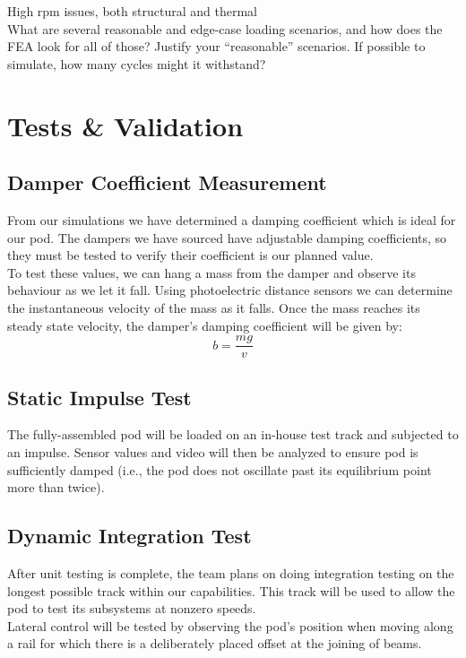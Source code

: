 \documentclass[main.tex]{subfiles}
\begin{document}
    High rpm issues, both structural and thermal\\
    What are several reasonable and edge-case loading scenarios, and how does the FEA look for all of those? Justify your “reasonable” scenarios. If possible to simulate, how many cycles might it withstand?

    \section{Tests \& Validation }
    \subsection{Damper Coefficient Measurement}
    From our simulations we have determined a damping coefficient which is ideal for our pod. The dampers we have sourced have adjustable damping coefficients, so they must be tested to verify their coefficient is our planned value.\\
    To test these values, we can hang a mass from the damper and observe its behaviour as we let it fall. Using photoelectric distance sensors we can determine the instantaneous velocity of the mass as it falls. Once the mass reaches its steady state velocity, the damper's damping coefficient will be given by:
	\[
     b = \frac{mg}{v}
    \]
    \subsection{Static Impulse Test}
    The fully-assembled pod will be loaded on an in-house test track and subjected to an impulse. Sensor values and video will then be analyzed to ensure pod is sufficiently damped (i.e., the pod does not oscillate past its equilibrium point more than twice).
    \subsection{Dynamic Integration Test}
    After unit testing is complete, the team plans on doing integration testing on the longest possible track within our capabilities. This track will be used to allow the pod to test its subsystems at nonzero speeds.\\
    Lateral control will be tested by observing the pod's position when moving along a rail for which there is a deliberately placed offset at the joining of beams.
\end{document}
